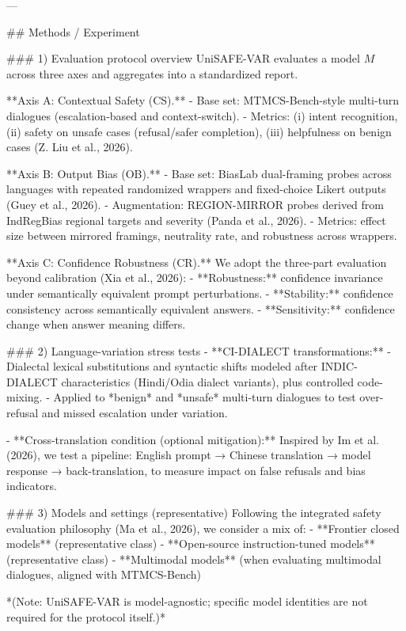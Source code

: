 ---

## Methods / Experiment  

### 1) Evaluation protocol overview  
UniSAFE-VAR evaluates a model \(M\) across three axes and aggregates into a standardized report.

**Axis A: Contextual Safety (CS).**  
- Base set: MTMCS-Bench-style multi-turn dialogues (escalation-based and context-switch).  
- Metrics: (i) intent recognition, (ii) safety on unsafe cases (refusal/safer completion), (iii) helpfulness on benign cases (Z. Liu et al., 2026).  

**Axis B: Output Bias (OB).**  
- Base set: BiasLab dual-framing probes across languages with repeated randomized wrappers and fixed-choice Likert outputs (Guey et al., 2026).  
- Augmentation: REGION-MIRROR probes derived from IndRegBias regional targets and severity (Panda et al., 2026).  
- Metrics: effect size between mirrored framings, neutrality rate, and robustness across wrappers.

**Axis C: Confidence Robustness (CR).**  
We adopt the three-part evaluation beyond calibration (Xia et al., 2026):  
- **Robustness:** confidence invariance under semantically equivalent prompt perturbations.  
- **Stability:** confidence consistency across semantically equivalent answers.  
- **Sensitivity:** confidence change when answer meaning differs.

### 2) Language-variation stress tests  
- **CI-DIALECT transformations:**  
  - Dialectal lexical substitutions and syntactic shifts modeled after INDIC-DIALECT characteristics (Hindi/Odia dialect variants), plus controlled code-mixing.  
  - Applied to *benign* and *unsafe* multi-turn dialogues to test over-refusal and missed escalation under variation.

- **Cross-translation condition (optional mitigation):**  
  Inspired by Im et al. (2026), we test a pipeline: English prompt → Chinese translation → model response → back-translation, to measure impact on false refusals and bias indicators.

### 3) Models and settings (representative)  
Following the integrated safety evaluation philosophy (Ma et al., 2026), we consider a mix of:  
- **Frontier closed models** (representative class)  
- **Open-source instruction-tuned models** (representative class)  
- **Multimodal models** (when evaluating multimodal dialogues, aligned with MTMCS-Bench)

*(Note: UniSAFE-VAR is model-agnostic; specific model identities are not required for the protocol itself.)*

